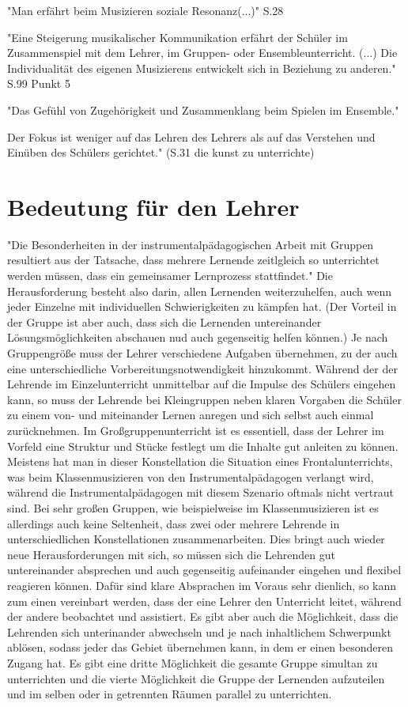 "Man erfährt beim Musizieren soziale Resonanz(...)" S.28

"Eine Steigerung musikalischer Kommunikation erfährt der Schüler im
Zusammenspiel mit dem Lehrer, im Gruppen- oder Ensembleunterricht. (...) Die Individualität des eigenen Musizierens entwickelt sich in
Beziehung zu
anderen."  S.99 Punkt 5

"Das Gefühl von Zugehörigkeit und Zusammenklang beim Spielen im Ensemble."

Der Fokus ist weniger auf
das Lehren des Lehrers als auf das Verstehen und Einüben des Schülers
gerichtet."  (S.31 die kunst zu unterrichte)


\section{Bedeutung für den Lehrer}

"Die Besonderheiten in der instrumentalpädagogischen Arbeit mit Gruppen
resultiert aus der Tatsache, dass mehrere Lernende zeitlgleich so unterrichtet
werden müssen, dass ein gemeinsamer Lernprozess stattfindet."
\autocite[221]{busch:grundwissen_instrumentalpaedagogik} Die Herausforderung
besteht also darin, allen Lernenden weiterzuhelfen, auch wenn jeder Einzelne mit
individuellen Schwierigkeiten zu kämpfen hat. (Der Vorteil in der Gruppe ist aber
auch, dass sich die Lernenden untereinander Lösungsmöglichkeiten abschauen nud
auch gegenseitig helfen können.) 
Je nach Gruppengröße muss der Lehrer verschiedene Aufgaben übernehmen,
zu der
auch eine unterschiedliche Vorbereitungsnotwendigkeit hinzukommt. Während der
der Lehrende im Einzelunterricht unmittelbar auf die Impulse des Schülers
eingehen kann, so muss der Lehrende bei Kleingruppen neben klaren Vorgaben die
Schüler zu einem von- und miteinander Lernen anregen und sich selbst auch einmal
zurücknehmen. Im Großgruppenunterricht ist es essentiell, dass der Lehrer im
Vorfeld eine Struktur und Stücke festlegt um die Inhalte gut anleiten zu können.\autocite[220]{busch:grundwissen_instrumentalpaedagogik}
Meistens hat man in dieser Konstellation die Situation eines Frontalunterrichts,
was beim Klassenmusizieren von den Instrumentalpädagogen verlangt wird, während die
Instrumentalpädagogen mit diesem Szenario oftmals nicht vertraut sind. Bei sehr
großen Gruppen, wie beispielweise im
Klassenmusizieren ist es allerdings auch keine Seltenheit, dass zwei oder
mehrere Lehrende in unterschiedlichen Konstellationen zusammenarbeiten. Dies
bringt auch wieder neue Herausforderungen mit sich, so müssen sich die Lehrenden
gut untereinander absprechen und auch gegenseitig aufeinander eingehen und
flexibel reagieren können. Dafür sind klare Absprachen im Voraus sehr dienlich,
so kann zum einen vereinbart werden, dass der eine Lehrer den Unterricht leitet,
während der andere beobachtet und assistiert. Es gibt aber auch die Möglichkeit,
dass die Lehrenden sich unterinander abwechseln und je nach inhaltlichem
Schwerpunkt ablösen, sodass jeder das Gebiet übernehmen kann, in dem er einen
besonderen Zugang hat. Es gibt eine dritte Möglichkeit die gesamte Gruppe
simultan zu unterrichten und die vierte Möglichkeit die Gruppe der Lernenden
aufzuteilen und im selben oder in getrennten Räumen parallel zu unterrichten.
\autocite{cook s. 461} 

